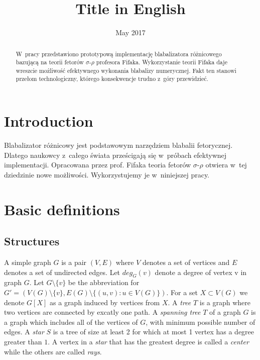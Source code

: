\documentclass[en]{pracamgr}
\title{Title in English}
\date{May 2017}
\begin{document}
\maketitle

\begin{abstract}
  W~pracy przedstawiono prototypową implementację blabalizatora
  różnicowego bazującą na teorii fetorów $\sigma$-$\rho$ profesora
  Fifaka.  Wykorzystanie teorii Fifaka daje wreszcie możliwość
  efektywnego wykonania blabalizy numerycznej.  Fakt ten stanowi
  przełom technologiczny, którego konsekwencje trudno z~góry
  przewidzieć.
\end{abstract}

\tableofcontents

\chapter*{Introduction}

Blabalizator różnicowy jest podstawowym narzędziem blabalii
fetorycznej.  Dlatego naukowcy z~całego świata prześcigają się
w~próbach efektywnej implementacji.  Opracowana przez prof. Fifaka
teoria fetorów $\sigma$-$\rho$ otwiera w~tej dziedzinie nowe
możliwości.  Wykorzystujemy je w~niniejszej pracy.

\chapter{Basic definitions}\label{r:pojecia}

\section{Structures}

A simple graph $G$ is a pair $(V,E)$ where $V$ denotes a set of vertices and $E$ denotes a set of undirected edges. Let $deg_G(v)$ denote a degree of vertex v in graph $G$. Let $G \setminus \{v\}$ be the abbreviation for $G'=(V(G) \setminus \{v\}, E(G) \setminus \{(u,v): u \in V(G)\})$. For a set $X \subset V(G)$ we denote $G[X]$ as a graph induced by vertices from $X$. A \emph{tree} $T$ is a graph where two vertices are connected by excatly one path. A \emph{spanning tree} $T$ of a graph $G$ is a graph which includes all of the vertices of $G$, with minimum possible number of edges. A \emph{star} $S$ is a tree of size at least 2 for which at most 1 vertex has a degree greater than $1$. A vertex in a \emph{star} that has the greatest degree is called a \emph{center} while the others are called \emph{rays}.
\end{document}
